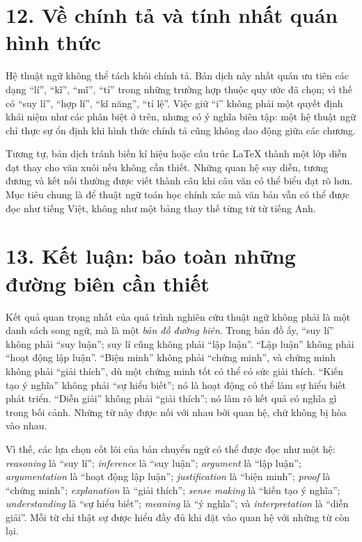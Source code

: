\section*{12. Về chính tả và tính nhất quán hình thức}

Hệ thuật ngữ không thể tách khỏi chính tả. Bản dịch này nhất quán ưu tiên các dạng ``lí'', ``kĩ'', ``mĩ'', ``tỉ'' trong những trường hợp thuộc quy ước đã chọn; vì thế có ``suy lí'', ``hợp lí'', ``kĩ năng'', ``tỉ lệ''. Việc giữ ``i'' không phải một quyết định khái niệm như các phân biệt ở trên, nhưng có ý nghĩa biên tập: một hệ thuật ngữ chỉ thực sự ổn định khi hình thức chính tả cũng không dao động giữa các chương.

Tương tự, bản dịch tránh biến kí hiệu hoặc cấu trúc LaTeX thành một lớp diễn đạt thay cho văn xuôi nếu không cần thiết. Những quan hệ suy diễn, tương đương và kết nối thường được viết thành câu khi câu văn có thể biểu đạt rõ hơn. Mục tiêu chung là để thuật ngữ toán học chính xác mà văn bản vẫn có thể được đọc như tiếng Việt, không như một bảng thay thế từng từ từ tiếng Anh.

\section*{13. Kết luận: bảo toàn những đường biên cần thiết}

Kết quả quan trọng nhất của quá trình nghiên cứu thuật ngữ không phải là một danh sách song ngữ, mà là một \emph{bản đồ đường biên}. Trong bản đồ ấy, ``suy lí'' không phải ``suy luận''; suy lí cũng không phải ``lập luận''. ``Lập luận'' không phải ``hoạt động lập luận''. ``Biện minh'' không phải ``chứng minh'', và chứng minh không phải ``giải thích'', dù một chứng minh tốt có thể có sức giải thích. ``Kiến tạo ý nghĩa'' không phải ``sự hiểu biết''; nó là hoạt động có thể làm sự hiểu biết phát triển. ``Diễn giải'' không phải ``giải thích''; nó làm rõ kết quả có nghĩa gì trong bối cảnh. Những từ này được nối với nhau bởi quan hệ, chứ không bị hòa vào nhau.

Vì thế, các lựa chọn cốt lõi của bản chuyển ngữ có thể được đọc như một hệ: \emph{reasoning} là ``suy lí''; \emph{inference} là ``suy luận''; \emph{argument} là ``lập luận''; \emph{argumentation} là ``hoạt động lập luận''; \emph{justification} là ``biện minh''; \emph{proof} là ``chứng minh''; \emph{explanation} là ``giải thích''; \emph{sense making} là ``kiến tạo ý nghĩa''; \emph{understanding} là ``sự hiểu biết''; \emph{meaning} là ``ý nghĩa''; và \emph{interpretation} là ``diễn giải''. Mỗi từ chỉ thật sự được hiểu đầy đủ khi đặt vào quan hệ với những từ còn lại.

